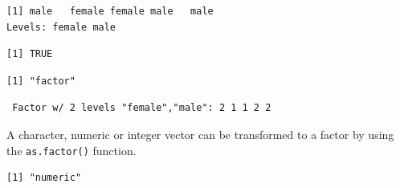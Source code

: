 \begin{verbatim}
[1] male   female female male   male  
Levels: female male
\end{verbatim}

\begin{Shaded}
\begin{Highlighting}[]
\end{Highlighting}
\end{Shaded}

\begin{verbatim}
[1] TRUE
\end{verbatim}

\begin{Shaded}
\begin{Highlighting}[]
\end{Highlighting}
\end{Shaded}

\begin{verbatim}
[1] "factor"
\end{verbatim}

\begin{Shaded}
\begin{Highlighting}[]
\end{Highlighting}
\end{Shaded}

\begin{verbatim}
 Factor w/ 2 levels "female","male": 2 1 1 2 2
\end{verbatim}

A character, numeric or integer vector can be transformed to a factor by
using the \texttt{as.factor()} function.

\begin{Shaded}
\begin{Highlighting}[]
\StringTok{ }\NormalTok{(}\NormalTok{, }\NormalTok{, }\NormalTok{)}
\end{Highlighting}
\end{Shaded}

\begin{verbatim}
[1] "numeric"
\end{verbatim}

\begin{Shaded}
\begin{Highlighting}[]
\end{Highlighting}
\end{Shaded}

